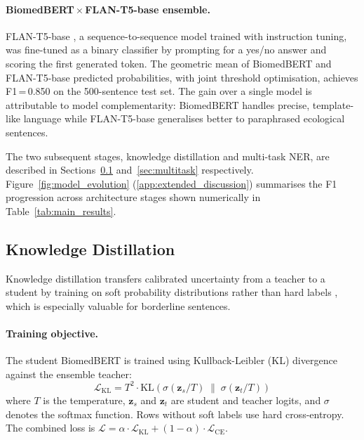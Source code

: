 \documentclass[a4paper,fleqn]{cas-sc}
\begin{document}
\paragraph{BiomedBERT\,$\times$\,FLAN-T5-base ensemble.}
FLAN-T5-base \citep{chung2022scaling}, a sequence-to-sequence model trained
with instruction tuning, was fine-tuned as a binary classifier by prompting
for a yes/no answer and scoring the first generated token. The geometric
mean of BiomedBERT and FLAN-T5-base predicted probabilities, with joint
threshold optimisation, achieves F1\,=\,0.850 on the 500-sentence test set.
The gain over a single model is attributable to model complementarity:
BiomedBERT handles precise, template-like language while FLAN-T5-base
generalises better to paraphrased ecological sentences.

The two subsequent stages, knowledge distillation and multi-task NER, are
described in Sections~\ref{sec:distillation} and~\ref{sec:multitask}
respectively. Figure~\ref{fig:model_evolution} (\ref{app:extended_discussion})
summarises the F1 progression across architecture stages shown numerically
in Table~\ref{tab:main_results}.

\subsection{Knowledge Distillation}
\label{sec:distillation}

Knowledge distillation \citep{hinton2015distilling} transfers calibrated
uncertainty from a teacher to a student by training on soft probability
distributions rather than hard labels \citep{bucilua2006model}, which is
especially valuable for borderline sentences.

\paragraph{Training objective.}
The student BiomedBERT is trained using Kullback-Leibler (KL) divergence
against the ensemble teacher:
\begin{equation}
    \mathcal{L}_\text{KL} = T^2 \cdot \mathrm{KL}\!\left(
        \sigma(\mathbf{z}_s / T) \;\|\; \sigma(\mathbf{z}_t / T)
    \right)
\end{equation}
where $T$ is the temperature, $\mathbf{z}_s$ and $\mathbf{z}_t$ are student
and teacher logits, and $\sigma$ denotes the softmax function.
Rows without soft labels use hard cross-entropy. The combined loss is
$\mathcal{L} = \alpha \cdot \mathcal{L}_\text{KL} + (1{-}\alpha) \cdot \mathcal{L}_\text{CE}$.
\end{document}
